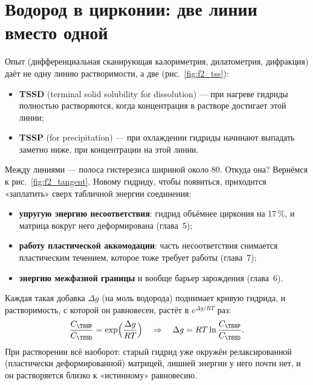 \section{Водород в цирконии: две линии вместо одной}

Опыт (дифференциальная сканирующая калориметрия, дилатометрия, дифракция) даёт не одну линию растворимости, а
две (рис.~\ref{fig:f2_tss}):
\begin{itemize}
\item \textbf{TSSD} (terminal solid solubility for dissolution) --- при нагреве гидриды полностью растворяются,
  когда концентрация в растворе достигает этой линии;
\item \textbf{TSSP} (for precipitation) --- при охлаждении гидриды начинают выпадать заметно ниже, при концентрации
  на этой линии.
\end{itemize}


Между линиями --- полоса гистерезиса шириной около 80\degC. Откуда она? Вернёмся к рис.~\ref{fig:f2_tangent}.
Новому гидриду, чтобы появиться, приходится «заплатить» сверх табличной энергии соединения:
\begin{itemize}
\item \textbf{упругую энергию несоответствия}: гидрид объёмнее циркония на 17\,\%, и матрица вокруг него
  деформирована (глава~5);
\item \textbf{работу пластической аккомодации}: часть несоответствия снимается пластическим течением, которое тоже
  требует работы (глава~7);
\item \textbf{энергию межфазной границы} и вообще барьер зарождения (глава~6).
\end{itemize}
Каждая такая добавка $\Delta g$ (на моль водорода) поднимает кривую гидрида, и растворимость, с которой он
равновесен, растёт в $e^{\Delta g/RT}$ раз:
\begin{equation}
\frac{C_\TSSP}{C_\TSSD} = \exp\Bigl(\frac{\Delta g}{RT}\Bigr)
\quad\Rightarrow\quad
\Delta g = RT\ln\frac{C_\TSSP}{C_\TSSD} .
\end{equation}
При растворении всё наоборот: старый гидрид уже окружён релаксированной (пластически деформированной) матрицей,
лишней энергии у него почти нет, и он растворяется близко к «истинному» равновесию.

